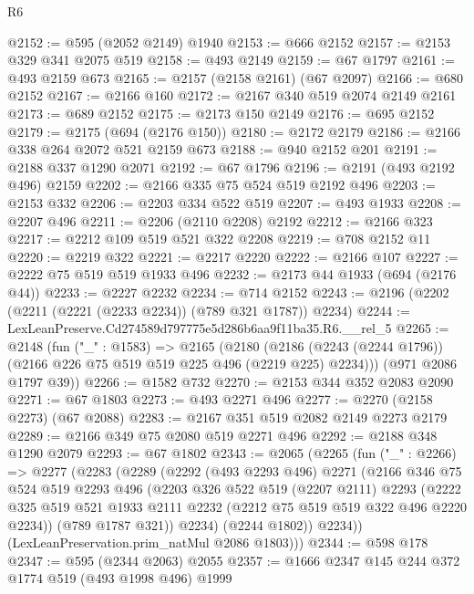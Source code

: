 \begin{lexlean}{R6}
\begin{coremodule}
@2152 := @595 (@2052 @2149) @1940
@2153 := @666 @2152
@2157 := @2153 @329 @341 @2075 @519
@2158 := @493 @2149
@2159 := @67 @1797
@2161 := @493 @2159 @673
@2165 := @2157 (@2158 @2161) (@67 @2097)
@2166 := @680 @2152
@2167 := @2166 @160
@2172 := @2167 @340 @519 @2074 @2149 @2161
@2173 := @689 @2152
@2175 := @2173 @150 @2149
@2176 := @695 @2152
@2179 := @2175 (@694 (@2176 @150))
@2180 := @2172 @2179
@2186 := @2166 @338 @264 @2072 @521 @2159 @673
@2188 := @940 @2152 @201
@2191 := @2188 @337 @1290 @2071
@2192 := @67 @1796
@2196 := @2191 (@493 @2192 @496) @2159
@2202 := @2166 @335 @75 @524 @519 @2192 @496
@2203 := @2153 @332
@2206 := @2203 @334 @522 @519
@2207 := @493 @1933
@2208 := @2207 @496
@2211 := @2206 (@2110 @2208) @2192
@2212 := @2166 @323
@2217 := @2212 @109 @519 @521 @322 @2208
@2219 := @708 @2152 @11
@2220 := @2219 @322
@2221 := @2217 @2220
@2222 := @2166 @107
@2227 := @2222 @75 @519 @519 @1933 @496
@2232 := @2173 @44 @1933 (@694 (@2176 @44))
@2233 := @2227 @2232
@2234 := @714 @2152
@2243 := @2196 (@2202 (@2211 (@2221 (@2233 @2234)) (@789 @321 @1787)) @2234)
@2244 := LexLeanPreserve.Cd274589d797775e5d286b6aa9f11ba35.R6.__rel_5
@2265 := @2148
    (fun ("_" : @1583) =>
    @2165
      (@2180 (@2186 (@2243 (@2244 @1796)) (@2166 @226 @75 @519 @519 @225 @496 (@2219 @225) @2234)))
      (@971 @2086 @1797 @39))
@2266 := @1582 @732
@2270 := @2153 @344 @352 @2083 @2090
@2271 := @67 @1803
@2273 := @493 @2271 @496
@2277 := @2270 (@2158 @2273) (@67 @2088)
@2283 := @2167 @351 @519 @2082 @2149 @2273 @2179
@2289 := @2166 @349 @75 @2080 @519 @2271 @496
@2292 := @2188 @348 @1290 @2079
@2293 := @67 @1802
@2343 := @2065
    (@2265
      (fun ("_" : @2266) =>
      @2277
        (@2283
          (@2289
            (@2292
              (@493 @2293 @496)
              @2271
              (@2166
                @346
                @75
                @524
                @519
                @2293
                @496
                (@2203
                  @326
                  @522
                  @519
                  (@2207 @2111)
                  @2293
                  (@2222
                    @325
                    @519
                    @521
                    @1933
                    @2111
                    @2232
                    (@2212 @75 @519 @519 @322 @496 @2220 @2234))
                  (@789 @1787 @321))
                @2234)
              (@2244 @1802))
            @2234))
        (LexLeanPreservation.prim_natMul @2086 @1803)))
@2344 := @598 @178
@2347 := @595 (@2344 @2063) @2055
@2357 := @1666 @2347 @145 @244 @372 @1774 @519 (@493 @1998 @496) @1999

\end{coremodule}
\end{lexlean}
